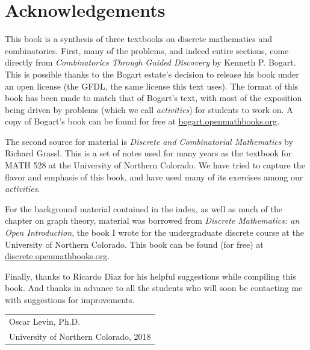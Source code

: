 \documentclass[10pt,]{book}
\theoremstyle{plain}
\theoremstyle{definition}
\theoremstyle{definition}
\theoremstyle{definition}
\numberwithin{equation}{chapter}
\begin{document}
\chapter*{Acknowledgements}\label{acknowledgement-1}
\hypertarget{p-1}{}%
This book is a synthesis of three textbooks on discrete mathematics and combinatorics.  First, many of the problems, and indeed entire sections, come directly from \textsl{Combinatorics Through Guided Discovery} by Kenneth P. Bogart.  This is possible thanks to the Bogart estate's decision to release his book under an open license (the GFDL, the same license this text uses).  The format of this book has been made to match that of Bogart's text, with most of the exposition being driven by problems (which we call \emph{activities}) for students to work on.  A copy of Bogart's book can be found for free at \href{http://bogart.openmathbooks.org/}{bogart.openmathbooks.org}.%
\par
\hypertarget{p-2}{}%
The second source for material is \textsl{Discrete and Combinatorial Mathematics} by Richard Grassl.  This is a set of notes used for many years as the textbook for MATH 528 at the University of Northern Colorado.  We have tried to capture the flavor and emphasis of this book, and have used many of its exercises among our \emph{activities}.%
\par
\hypertarget{p-3}{}%
For the background material contained in the index, as well as much of the chapter on graph theory, material was borrowed from \textsl{Discrete Mathematics: an Open Introduction}, the book I wrote for the undergraduate discrete course at the University of Northern Colorado.  This book can be found (for free) at \href{http://discrete.openmathbooks.org/}{discrete.openmathbooks.org}.%
\par
\hypertarget{p-4}{}%
Finally, thanks to Ricardo Diaz for his helpful suggestions while compiling this book.  And thanks in advance to all the students who will soon be contacting me with suggestions for improvements.%
\par\hfill\begin{tabular}{l@{}}
Oscar Levin, Ph.D.\\
University of Northern Colorado, 2018
\end{tabular}\\\par
\end{document}
